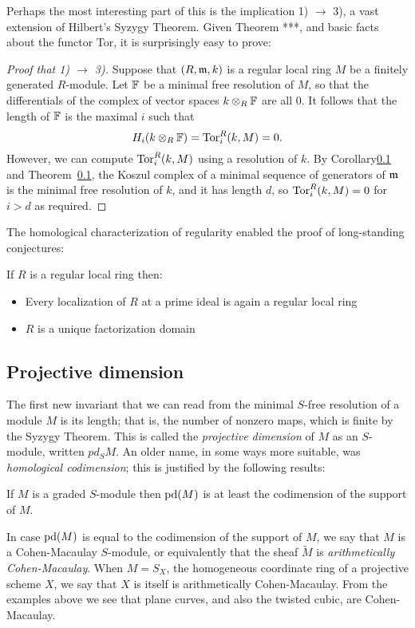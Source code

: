 Perhaps the most interesting part of this is the implication 1) $\to$ 3), a vast extension of Hilbert's Syzygy Theorem.
Given Theorem ***, and basic facts about the functor Tor, it is surprisingly easy to prove:

\begin{proof} [Proof that 1) $\to$ 3)] Suppose that $(R,\gm,k)$ is a regular local ring $M$ be a finitely generated
 $R$-module. Let $\FF$ be a minimal free resolution of $M$, so that the differentials of the complex of vector
 spaces $k\otimes_{R}\FF$ are all 0. It follows that the length of $\FF$ is the maximal $i$ such that
 $$
 H_{i}(k\otimes_{R}\FF) = \Tor_{i}^{R}(k,M) = 0.
 $$
 However, we can compute $\Tor_{i}^{R}(k,M)$ using a resolution of $k$. By Corollary\ref{} and 
 Theorem~\ref{},  the Koszul complex of a minimal sequence of generators of $\gm$  is the minimal free resolution of $k$, and it has length $d$, so $\Tor_{i}^{R}(k,M) = 0$ for $i>d$ as required.
\end{proof}

 The homological characterization of regularity enabled the proof of long-standing conjectures:
\begin{theorem} \cite{AB} If $R$ is a regular local ring then:
\begin{itemize}
 \item Every localization of $R$ at a prime ideal is again a regular local ring
  \item  $R$ is a unique factorization  domain
\end{itemize}
 \end{theorem}
 
 \subsection{Projective dimension}
The first new invariant that we can read from the minimal $S$-free resolution of a module $M$ is its length; that is, the number of nonzero maps, which is finite by the Syzygy Theorem. This is called the \emph{projective dimension} of $M$ as an $S$-module, written $pd_{S}M$. An older name, in some ways more suitable, was \emph{homological codimension}; this is justified by the following results:

\begin{proposition}\label{pd lower bound}
If $M$ is a graded $S$-module then $\pd(M)$ is at least the codimension of the support of $M$.
\end{proposition}

In case $\pd(M)$ is equal to the codimension of the support of $M$, we say that $M$ is a
Cohen-Macaulay $S$-module, or equivalently that the sheaf $\widetilde M$ is 
\emph{arithmetically Cohen-Macaulay}. When $M = S_{X}$, the homogeneous coordinate ring of a projective scheme $X$, we say that $X$ is itself is arithmetically Cohen-Macaulay. From the examples above we see that plane curves, and also the twisted cubic, are Cohen-Macaulay.

